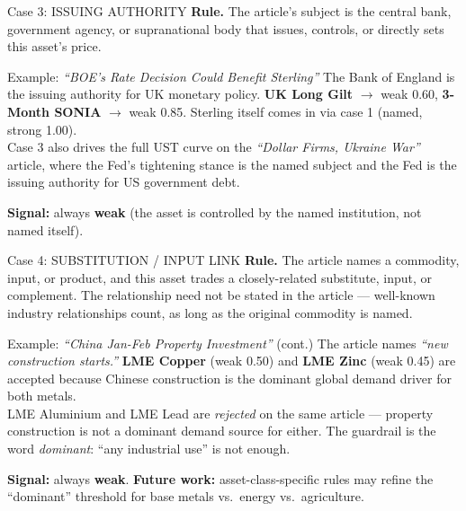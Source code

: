 \documentclass[10pt,aspectratio=169]{beamer}
\begin{document}
\begin{frame}{Case 3: ISSUING AUTHORITY}
  \small
  \textbf{Rule.} The article's subject is the central bank, government
  agency, or supranational body that issues, controls, or directly sets
  this asset's price.

  \medskip
  \begin{block}{Example: \textit{``BOE's Rate Decision Could Benefit Sterling''}}
    The Bank of England is the issuing authority for UK monetary policy.
    \textbf{UK Long Gilt} $\to$ weak 0.60, \textbf{3-Month SONIA} $\to$
    weak 0.85. Sterling itself comes in via case 1 (named, strong 1.00).
    \\[4pt]
    Case 3 also drives the full UST curve on the
    \textit{``Dollar Firms, Ukraine War''} article, where the Fed's
    tightening stance is the named subject and the Fed is the issuing
    authority for US government debt.
  \end{block}

  \medskip
  \textbf{Signal:} always \textbf{weak} (the asset is controlled by the
  named institution, not named itself).
\end{frame}

\begin{frame}{Case 4: SUBSTITUTION / INPUT LINK}
  \small
  \textbf{Rule.} The article names a commodity, input, or product, and this
  asset trades a closely-related substitute, input, or complement. The
  relationship need not be stated in the article --- well-known industry
  relationships count, as long as the original commodity is named.

  \medskip
  \begin{block}{Example: \textit{``China Jan-Feb Property Investment''} (cont.)}
    The article names \textit{``new construction starts.''} \textbf{LME
    Copper} (weak 0.50) and \textbf{LME Zinc} (weak 0.45) are accepted
    because Chinese construction is the dominant global demand driver for
    both metals. \\[4pt]
    LME Aluminium and LME Lead are \emph{rejected} on the same article ---
    property construction is not a dominant demand source for either.
    The guardrail is the word \emph{dominant}: ``any industrial use'' is
    not enough.
  \end{block}

  \medskip
  \textbf{Signal:} always \textbf{weak}.
  \textbf{Future work:} asset-class-specific rules may refine the
  ``dominant'' threshold for base metals vs.\ energy vs.\ agriculture.
\end{frame}
\end{document}
